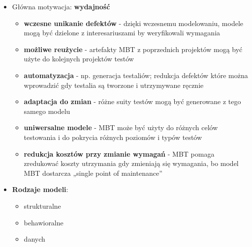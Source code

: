 \documentclass[../main.tex]{subfiles}
\begin{document}
\begin{itemize}
        \item Główna motywacja: \textbf{wydajność}
        \begin{itemize}
            \item \textbf{wczesne unikanie defektów} - dzięki wczesnemu modelowaniu, modele
            mogą być dzielone z interesariuszami by weryfikowali wymagania
            \item \textbf{możliwe reużycie} - artefakty MBT z poprzednich projektów
            mogą być użyte do kolejnych projektów testów
            \item \textbf{automatyzacja} - np. generacja testaliów; redukcja defektów które można
            wprowadzić gdy testalia są tworzone i utrzymywane ręcznie
            \item \textbf{adaptacja do zmian} - różne suity testów mogą być generowane z tego samego modelu
            \item \textbf{uniwersalne modele} - MBT może być użyty do różnych celów testowania i do pokrycia
            różnych poziomów i typów testów
            \item \textbf{redukcja kosztów przy zmianie wymagań} - MBT pomaga zredukować koszty utrzymania gdy
            zmieniają się wymagania, bo model MBT dostarcza „single point of maintenance”
        \end{itemize}

        \item \textbf{Rodzaje modeli}:
        \begin{itemize}
            \item strukturalne
            \item behawioralne
            \item danych
        \end{itemize}
    \end{itemize}
\end{document}
